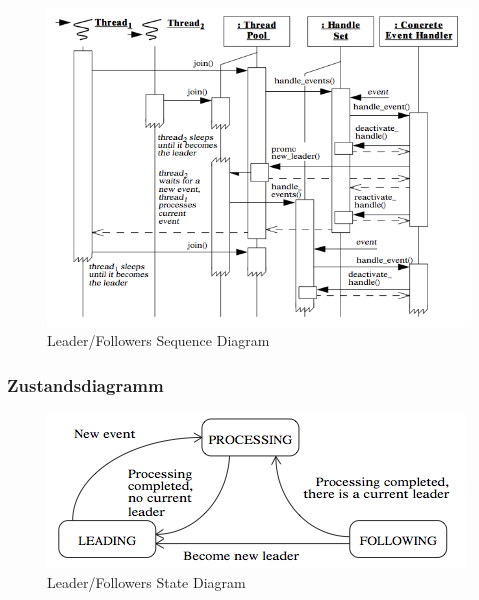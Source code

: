 \begin{figure}[H]
	\centering
	\includegraphics[width=\textwidth]{content/posa2/leader-followers/images/leaderFollowersSequenceDiagram.png}
	\caption{Leader/Followers Sequence Diagram}
\end{figure}


\subsubsection*{Zustandsdiagramm}


\begin{figure}[H]
	\centering
	\includegraphics[width=\textwidth]{content/posa2/leader-followers/images/leaderFollowersStateDiagram.png}
	\caption{Leader/Followers State Diagram}
\end{figure}


